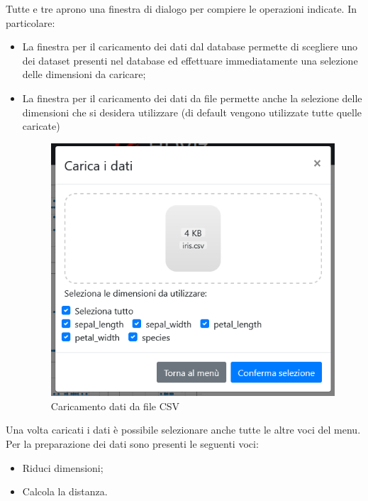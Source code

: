 Tutte e tre aprono una finestra di dialogo per compiere le operazioni indicate. In particolare:
\begin{itemize}
	\item La finestra per il caricamento dei dati dal database permette di scegliere uno dei dataset presenti nel database ed effettuare immediatamente una selezione delle dimensioni da caricare;
	\item  La finestra per il caricamento dei dati da file  permette anche la selezione delle dimensioni che si desidera utilizzare (di default vengono utilizzate tutte quelle caricate)
	\begin{figure}[H]
		\includegraphics[scale=0.5]{Images/CaricamentoCSV.png}
		\centering
		\caption{Caricamento dati da file CSV}
	\end{figure}
\end{itemize}

Una volta caricati i dati è possibile selezionare anche tutte le altre voci del menu. Per la preparazione dei dati sono presenti le seguenti voci:

\begin{itemize}
	\item Riduci dimensioni;
	
	\item Calcola la distanza.
\end{itemize}

